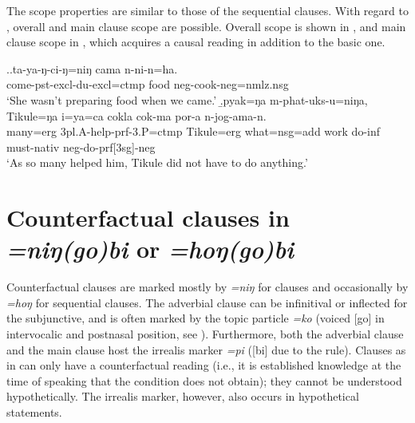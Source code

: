 The scope properties are similar to those of the sequential clauses. With regard  to , overall and main clause scope are possible. Overall scope is shown in \Next[a], and main clause scope in \Next[b], which acquires a causal reading in addition to the basic  one. 

\ex.\ag.ta-ya-ŋ-ci-ŋ=niŋ cama n-ni-n=ha.\\
		come{\sc -pst-excl-du-excl=ctmp} food {\sc neg-}cook{\sc [pst;3.P]-neg=nmlz.nsg}\\
		‘She wasn’t preparing food when we came.’
	\b.\label{ex-tikule-do}\gll	pyak=ŋa m-phat-uks-u=niŋa, Tikule=ŋa   i=ya=ca cokla cok-ma    por-a n-jog-ama-n.\\
		many={\sc erg} {\sc 3pl.A-}help{\sc -prf-3.P=ctmp} Tikule={\sc erg} what{\sc =nsg=add} work  do{\sc -inf} must{\sc -nativ} {\sc neg-}do{\sc -prf[3sg]-neg}\\
		‘As so many helped him, Tikule did not have to do anything.’ 



\section{Counterfactual clauses in \emph{=niŋ(go)bi} or  \emph{=hoŋ(go)bi} }\label{adv-cl-count}

Counterfactual clauses are marked mostly by \emph{=niŋ} for  clauses and occasionally by \emph{=hoŋ} for sequential clauses. The adverbial clause can be infinitival or inflected for the subjunctive, and is often marked by the topic particle \emph{=ko} (voiced [go]  in intervocalic and postnasal position, see ). Furthermore, both the adverbial clause and the main clause host the irrealis marker \emph{=pi} ([bi] due to the  rule). Clauses as in \Next can only have a counterfactual reading (i.e., it is established knowledge at the time of speaking that the condition does not obtain); they cannot be understood hypothetically. The irrealis marker, however, also occurs in hypothetical statements.



